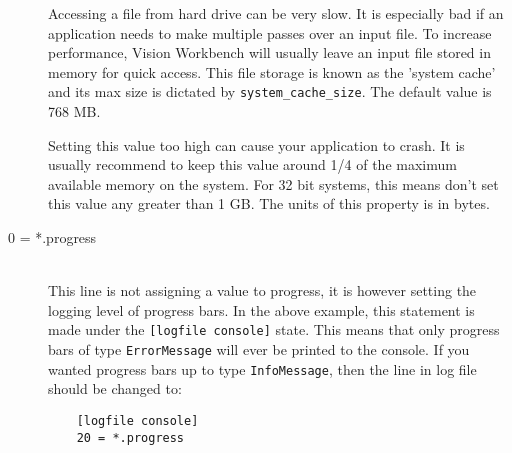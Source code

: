 \begin{description}
Accessing a file from hard drive can be very slow. It is especially
bad if an application needs to make multiple passes over an input
file. To increase performance, Vision Workbench will usually leave an
input file stored in memory for quick access. This file storage is
known as the 'system cache' and its max size is dictated by
\texttt{system\_cache\_size}. The default value is 768 MB.

Setting this value too high can cause your application to crash. It is
usually recommend to keep this value around 1/4 of the maximum
available memory on the system. For 32 bit systems, this means don't
set this value any greater than 1 GB. The units of this property is in
bytes.

\item[0 = *.progress] \hfill \\

This line is not assigning a value to progress, it is however setting
the logging level of progress bars. In the above example, this
statement is made under the \texttt{[logfile console]} state. This
means that only progress bars of type \texttt{ErrorMessage} will ever
be printed to the console. If you wanted progress bars up to type
\texttt{InfoMessage}, then the line in log file should be changed to:

\begin{verbatim}
    [logfile console]
    20 = *.progress
\end{verbatim}

\end{description}
